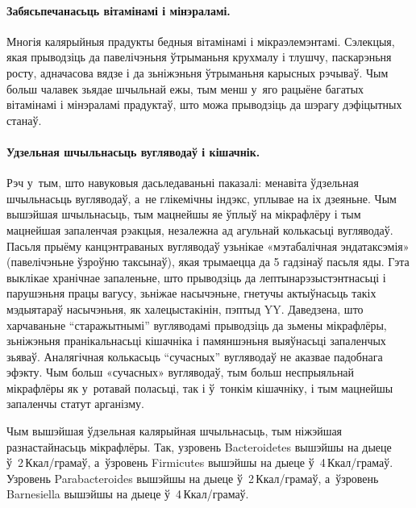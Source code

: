 \paragraph{Забясьпечанасьць вітамінамі і мінэраламі.}
Многія калярыйныя прадукты бедныя вітамінамі і мікраэлемэнтамі. Сэлекцыя, якая прыводзіць да павелічэньня ўтрыманьня крухмалу і тлушчу, паскарэньня росту, адначасова вядзе і да зьніжэньня ўтрыманьня карысных рэчываў. Чым больш чалавек зьядае шчыльнай ежы, тым менш у~яго рацыёне багатых вітамінамі і мінэраламі прадуктаў, што можа прыводзіць да шэрагу дэфіцытных станаў.


\paragraph{Удзельная шчыльнасьць вугляводаў і кішачнік.}
Рэч у~тым, што навуковыя дасьледаваньні паказалі: менавіта ўдзельная шчыльнасьць вугляводаў, а~не глікемічны індэкс, уплывае на іх дзеяньне. Чым вышэйшая шчыльнасьць, тым мацнейшы яе ўплыў на мікрафлёру і тым мацнейшая запаленчая рэакцыя, незалежна ад агульнай колькасьці вугляводаў. Пасьля прыёму канцэнтраваных вугляводаў узьнікае «мэтабалічная эндатаксэмія» (павелічэньне ўзроўню таксынаў), якая трымаецца да 5 гадзінаў пасьля яды. Гэта выклікае хранічнае запаленьне, што прыводзіць да лептынарэзыстэнтнасьці і парушэньня працы вагусу, зьніжае насычэньне, гнетучы актыўнасьць такіх мэдыятараў насычэньня, як халецыстакінін, пэптыд YY. Даведзена, што харчаваньне ``старажытнымі'' вугляводамі прыводзіць да зьмены мікрафлёры, зьніжэньня пранікальнасьці кішачніка і памяншэньня выяўнасьці запаленчых зьяваў. Аналягічная колькасьць ``сучасных'' вугляводаў не аказвае падобнага эфэкту. Чым больш «сучасных» вугляводаў, тым больш неспрыяльнай мікрафлёры як у~ротавай поласьці, так і ў~тонкім кішачніку, і тым мацнейшы запаленчы статут арганізму.

Чым вышэйшая ўдзельная калярыйная шчыльнасьць, тым ніжэйшая разнастайнасьць мікрафлёры. Так, узровень Bacteroidetes вышэйшы на дыеце ў~2\,Ккал/грамаў, а~ўзровень Firmicutes вышэйшы на дыеце ў~4\,Ккал/грамаў. Узровень Parabacteroides вышэйшы на дыеце ў~2\,Ккал/грамаў, а~ўзровень Barnesiella вышэйшы на дыеце ў~4\,Ккал/грамаў.

